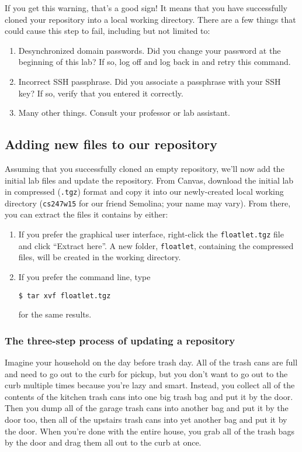 \documentclass[12pt]{article}
\begin{document}
If you get this warning, that's a good sign!  It means that you have successfully cloned your repository into a local working directory.  There are a few things that could cause this step to fail, including but not limited to:

	\begin{enumerate}
	\item Desynchronized domain passwords.  Did you change your password at the beginning of this lab?  If so, log off and log back in and retry this command.
	\item Incorrect SSH passphrase.  Did you associate a passphrase with your SSH key?  If so, verify that you entered it correctly.
	\item Many other things.  Consult your professor or lab assistant.
	\end{enumerate}

\subsection{Adding new files to our repository}
Assuming that you successfully cloned an empty repository, we'll now add the initial lab files and update the repository.  From Canvas, download the initial lab in compressed (\verb|.tgz|) format and copy it into our newly-created local working directory (\verb|cs247w15| for our friend Semolina; your name may vary).  From there, you can extract the files it contains by either:

	\begin{enumerate}
	\item If you prefer the graphical user interface, right-click the \verb|floatlet.tgz| file and click ``Extract here''.  A new folder, \verb|floatlet|, containing the compressed files, will be created in the working directory.
	\item If you prefer the command line, type
\begin{verbatim}
$ tar xvf floatlet.tgz
\end{verbatim}
	for the same results.
	\end{enumerate}

\subsubsection{The three-step process of updating a repository}
Imagine your household on the day before trash day.  All of the trash cans are full and need to go out to the curb for pickup, but you don't want to go out to the curb multiple times because you're lazy and smart.  Instead, you collect all of the contents of the kitchen trash cans into one big trash bag and put it by the door.  Then you dump all of the garage trash cans into another bag and put it by the door too, then all of the upstairs trash cans into yet another bag and put it by the door.  When you're done with the entire house, you grab all of the trash bags by the door and drag them all out to the curb at once.
\end{document}
